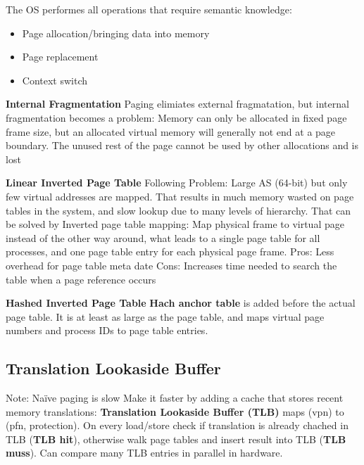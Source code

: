 \documentclass[11pt,a4paper]{article}
\begin{document}
	The OS performes all operations that require semantic knowledge:
	\begin{itemize}
		\item Page allocation/bringing data into memory
		\item Page replacement
		\item Context switch
	\end{itemize}
	
	\textbf{Internal Fragmentation} \newline
	Paging elimiates external fragmatation, but internal fragmentation becomes a problem: Memory can only be allocated in fixed page frame size, but an allocated virtual memory will generally not end at a page boundary. The unused rest of the page cannot be used by other allocations and is lost \newline
	
	\textbf{Linear Inverted Page Table} \newline
	Following Problem: Large AS (64-bit) but only few virtual addresses are mapped. That results in much memory wasted on page tables in the system, and slow lookup due to many levels of hierarchy. That can be solved by Inverted page table mapping: Map physical frame to virtual page instead of the other way around, what leads to a single page table for all processes, and one page table entry for each physical page frame. \newline
	Pros: Less overhead for page table meta date \newline
	Cons: Increases time needed to search the table when a page reference occurs \newline
	
	\textbf{Hashed Inverted Page Table} \newline
	\textbf{Hach anchor table} is added before the actual page table. It is at least as large as the page table, and maps virtual page numbers and process IDs to page table entries.
	
	\subsection{Translation Lookaside Buffer}
	Note: Naïve paging is slow \newline
	Make it faster by adding a cache that stores recent memory translations: \textbf{Translation Lookaside Buffer (TLB)} maps (vpn) to (pfn, protection). \newline
	On every load/store check if translation is already chached in TLB (\textbf{TLB hit}), otherwise walk page tables and insert result into TLB (\textbf{TLB muss}). Can compare many TLB entries in parallel in hardware. \newline
	
\end{document}
